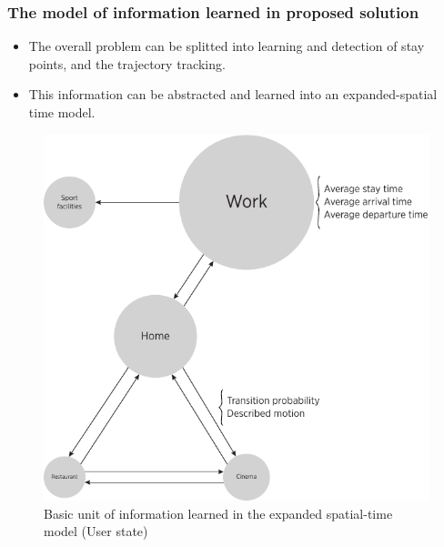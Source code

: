 \documentclass[compress,9pt,xcolor={dvipsnames,table}]{beamer}
\begin{document}
\begin{frame}[t]\frametitle{The model of information learned in proposed solution}
\small
\begin{itemize}
  \item The overall problem can be splitted into learning and detection of stay points, and the trajectory tracking.
\item This information can be abstracted and learned into an expanded-spatial time model. 
\end{itemize}

\begin{figure}[tb]
  \centering
  \includegraphics[scale=0.45]{../../../resources/images/vectors/mobility-graph}
  \caption{Basic unit of information learned in the expanded spatial-time model (User state)}
  \label{fig:basic-unit-of-information-learned}
\end{figure}
\end{frame}
\end{document}
